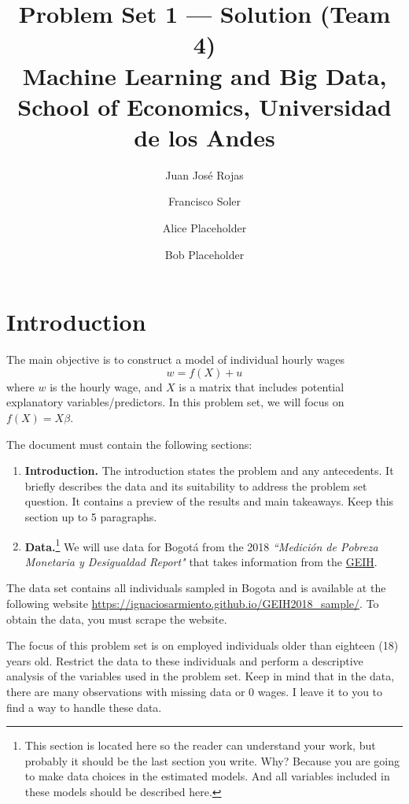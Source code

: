 \documentclass[12pt,a4paper,onecolumn]{article}
\title{\textbf{Problem Set 1 --- Solution (Team 4)}\\
\large Machine Learning and Big Data, School of Economics, Universidad de los Andes}
\author{Juan Jos\'e Rojas}
\author{Francisco Soler}
\author{Alice Placeholder}
\author{Bob Placeholder}
\date{}
\begin{document}
\maketitle
\thispagestyle{empty}
\onehalfspacing

\section{Introduction}

The main objective is to construct a model of individual hourly wages
\begin{equation}
w = f(X) + u
\end{equation}
where $w$ is the hourly wage, and $X$ is a matrix that includes potential explanatory variables/predictors. In this problem set, we will focus on $f(X)=X\beta$.

The document must contain the following sections:

\begin{enumerate}[1.]
  \item \textbf{Introduction.} The introduction states the problem and any antecedents. It briefly describes the data and its suitability to address the problem set question. It contains a preview of the results and main takeaways. Keep this section up to 5 paragraphs.

  \item \textbf{Data.}\footnote{This section is located here so the reader can understand your work, but probably it should be the last section you write. Why? Because you are going to make data choices in the estimated models. And all variables included in these models should be described here.} We will use data for Bogotá from the 2018 \emph{``Medición de Pobreza Monetaria y Desigualdad Report"} that takes information from the \href{https://www.dane.gov.co/}{GEIH}.
\end{enumerate}

\medskip

\noindent The data set contains all individuals sampled in Bogota and is available at the following website \href{https://ignaciosarmiento.github.io/GEIH2018_sample/}{https://ignaciosarmiento.github.io/GEIH2018\_sample/}. To obtain the data, you must scrape the website.

The focus of this problem set is on employed individuals older than eighteen (18) years old. Restrict the data to these individuals and perform a descriptive analysis of the variables used in the problem set. Keep in mind that in the data, there are many observations with missing data or 0 wages. I leave it to you to find a way to handle these data.
\end{document}
